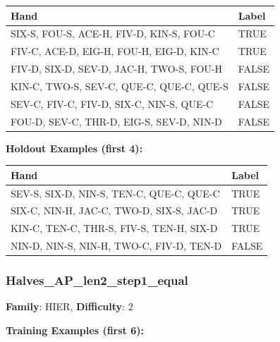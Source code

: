 \documentclass[10pt,a4paper]{article}
\begin{document}
\begin{small}
\begin{tabular}{p{8cm}l}
\toprule
Hand & Label \\
\midrule
SIX-S, FOU-S, ACE-H, FIV-D, KIN-S, FOU-C & \textcolor{positive}{TRUE} \\
FIV-C, ACE-D, EIG-H, FOU-H, EIG-D, KIN-C & \textcolor{positive}{TRUE} \\
FIV-D, SIX-D, SEV-D, JAC-H, TWO-S, FOU-H & \textcolor{negative}{FALSE} \\
KIN-C, TWO-S, SEV-C, QUE-C, QUE-C, QUE-S & \textcolor{negative}{FALSE} \\
SEV-C, FIV-C, FIV-D, SIX-C, NIN-S, QUE-C & \textcolor{negative}{FALSE} \\
FOU-D, SEV-C, THR-D, EIG-S, SEV-D, NIN-D & \textcolor{negative}{FALSE} \\
\bottomrule
\end{tabular}
\end{small}

\textbf{Holdout Examples (first 4):}

\begin{small}
\begin{tabular}{p{8cm}l}
\toprule
Hand & Label \\
\midrule
SEV-S, SIX-D, NIN-S, TEN-C, QUE-C, QUE-C & \textcolor{positive}{TRUE} \\
SIX-C, NIN-H, JAC-C, TWO-D, SIX-S, JAC-D & \textcolor{positive}{TRUE} \\
KIN-C, TEN-C, THR-S, FIV-S, TEN-H, SIX-D & \textcolor{positive}{TRUE} \\
NIN-D, NIN-S, NIN-H, TWO-C, FIV-D, TEN-D & \textcolor{negative}{FALSE} \\
\bottomrule
\end{tabular}
\end{small}

\vspace{0.5cm}

\subsubsection{Halves\_AP\_len2\_step1\_equal}

\textbf{Family}: HIER, \textbf{Difficulty}: 2

\textbf{Training Examples (first 6):}
\end{document}
